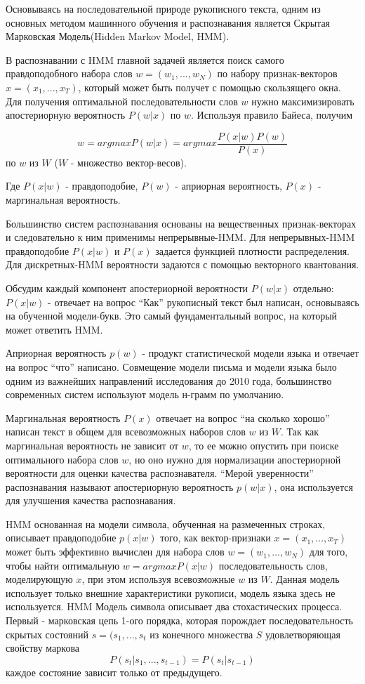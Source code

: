 Основываясь на последовательной природе рукописного текста, одним из основных методом машинного обучения и распознавания является Скрытая Марковская Модель(Hidden Markov Model, HMM).

В распознавании с HMM главной задачей является поиск самого правдоподобного набора слов $w = (w_{1},...,w_{N})$ по набору признак-векторов $x = (x_{1},...,x_{T})$, который может быть получет с помощью скользящего окна.
Для получения оптимальной последовательности слов $w$ нужно максимизировать апостериорную вероятность $P(w|x)$ по $w$. Используя правило Байеса, получим

$$w = arg max P(w|x) = arg max \frac{P(x|w)P(w)}{P(x)}$$ по $w$ из $W$ ($W$ - множество вектор-весов).

Где $P(x|w)$ - правдоподобие, $P(w)$ - априорная вероятность, $P(x)$ - маргинальная вероятность.

Большинство систем распознавания основаны на вещественных признак-векторах и следовательно к ним применимы непрерывные-HMM. Для непрерывных-HMM правдоподобие $P(x|w)$ и $P(x)$ задается функцией плотности распределения. Для дискретных-HMM вероятности задаются с помощью векторного квантования.

Обсудим каждый компонент апостериорной вероятности $P(w|x)$ отдельно:
$P(x|w)$ - отвечает на вопрос “Как” рукописный текст был написан, основываясь на обученной модели-букв. Это самый фундаментальный вопрос, на который может ответить HMM.

Априорная вероятность $p(w)$ - продукт статистической модели языка и отвечает на вопрос “что” написано. Совмещение модели письма и модели языка было одним из важнейших направлений исследования до 2010 года, большинство современных систем используют модель н-грамм по умолчанию.

Маргинальная вероятность $P(x)$ отвечает на вопрос “на сколько хорошо” написан текст в общем для всевозможных наборов слов $w$ из $W$. Так как маргинальная вероятность не зависит от $w$, то ее можно опустить при поиске оптимального набора слов $w$, но оно нужно для нормализации апостериорной вероятности для оценки качества распознавателя. “Мерой уверенности” распознавания называют апостериорную вероятность $p(w|x)$, она используется для улучшения качества распознавания.

HMM основанная на модели символа, обученная на размеченных строках, описывает правдоподобие $p(x|w)$ того, как вектор-признаки $x = (x_{1},...,x_{T})$ может быть эффективно вычислен для набора слов $w = (w_{1},...,w_{N})$ для того, чтобы найти оптимальную $w = argmax P(x|w)$ последовательность слов, моделирующую $x$, при этом используя всевозможные $w$ из $W$. Данная модель использует только внешние характеристики рукописи, модель языка здесь не используется.
HMM Модель символа описывает два стохастических процесса.  Первый - марковская цепь 1-ого порядка, которая порождает последовательность скрытых состояний $s = (s_{1},...,s_{t}$ из конечного множества $S$ удовлетворяющая свойству маркова $$P(s_{t}| s_{1},...,s_{t-1})= P(s_{t}|s_{t-1})$$ каждое состояние зависит только от предыдущего.

